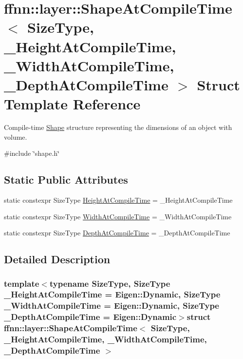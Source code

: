 \hypertarget{structffnn_1_1layer_1_1_shape_at_compile_time}{\section{ffnn\-:\-:layer\-:\-:Shape\-At\-Compile\-Time$<$ Size\-Type, \-\_\-\-Height\-At\-Compile\-Time, \-\_\-\-Width\-At\-Compile\-Time, \-\_\-\-Depth\-At\-Compile\-Time $>$ Struct Template Reference}
\label{structffnn_1_1layer_1_1_shape_at_compile_time}
}


Compile-\/time \hyperlink{structffnn_1_1layer_1_1_shape}{Shape} structure representing the dimensions of an object with volume.  




{\ttfamily \#include \char`\"{}shape.\-h\char`\"{}}

\subsection*{Static Public Attributes}
\begin{DoxyCompactItemize}
\item 
static constexpr Size\-Type \hyperlink{structffnn_1_1layer_1_1_shape_at_compile_time_a5b9207d5695b3f41d8ebf77bd45853a9}{Height\-At\-Compile\-Time} = \-\_\-\-Height\-At\-Compile\-Time
\item 
static constexpr Size\-Type \hyperlink{structffnn_1_1layer_1_1_shape_at_compile_time_a2a4feac621922000b64a6143a7ba4bc9}{Width\-At\-Compile\-Time} = \-\_\-\-Width\-At\-Compile\-Time
\item 
static constexpr Size\-Type \hyperlink{structffnn_1_1layer_1_1_shape_at_compile_time_a94daa70f5c1e1e85de32bd6234fb675a}{Depth\-At\-Compile\-Time} = \-\_\-\-Depth\-At\-Compile\-Time
\end{DoxyCompactItemize}


\subsection{Detailed Description}
\subsubsection*{template$<$typename Size\-Type, Size\-Type \-\_\-\-Height\-At\-Compile\-Time = Eigen\-::\-Dynamic, Size\-Type \-\_\-\-Width\-At\-Compile\-Time = Eigen\-::\-Dynamic, Size\-Type \-\_\-\-Depth\-At\-Compile\-Time = Eigen\-::\-Dynamic$>$struct ffnn\-::layer\-::\-Shape\-At\-Compile\-Time$<$ Size\-Type, \-\_\-\-Height\-At\-Compile\-Time, \-\_\-\-Width\-At\-Compile\-Time, \-\_\-\-Depth\-At\-Compile\-Time $>$}


